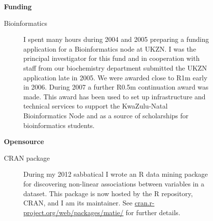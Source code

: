           
 \begin{description}\item[] \begin{description}\item[] {\large \bf  Funding }
\begin{description}
 \item[ Bioinformatics     ]  
          I spent many hours during 2004 and 2005 preparing
          a funding application for a
          Bioinformatics node at UKZN. 
          I was the principal investigator
          for this fund and in cooperation
          with staff from our biochemistry department
          submitted the UKZN application
          late in 2005.
          We were awarded close to R1m early in 2006.
          During 2007 a further R0.5m continuation award was made.
          This award has been used to set up infrastructure and technical
          services to support the KwaZulu-Natal Bioinformatics Node and
          as a source of scholarships for bioinformatics students.
          
\end{description}
\end{description}
\end{description}
          
\begin{description}\item[] \begin{description}\item[] {\large \bf  Opensource }
\begin{description}
\item[ CRAN package ]
	During my 2012 sabbatical I wrote an R data mining package for discovering
	non-linear associations between variables in a dataset. This package is now hosted
	by the R repository, CRAN, and I am its maintainer. See 
        \url{cran.r-project.org/web/packages/matie/}
        for further details.
\end{description}
\end{description}
\end{description}

